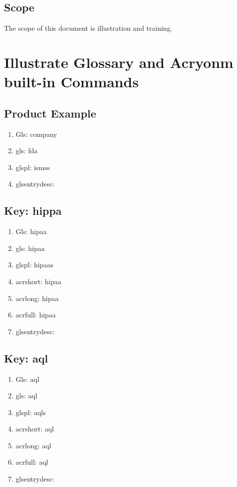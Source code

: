 \subsection{Scope}
The scope of this document is illustration and training.

\section{Illustrate Glossary and Acryonm built-in Commands}

\subsection{Product Example}
\begin{enumerate}
  \item Gls:                   \Gls{company}
  \item gls:                   \gls{fda}
  \item glspl:               \glspl{isms}
  \item glsentrydesc: 
\end{enumerate}

\subsection{Key: hippa}
\begin{enumerate}
  \item Gls:                   \Gls{hipaa}
  \item gls:                   \gls{hipaa}
  \item glspl:               \glspl{hipaa}
  \item acrshort:         \acrshort{hipaa}
  \item acrlong:           \acrlong{hipaa}
  \item acrfull:           \acrfull{hipaa}
  \item glsentrydesc: 
\end{enumerate}

\subsection{Key: aql}
\begin{enumerate}
  \item Gls:                   \Gls{aql}
  \item gls:                   \gls{aql}
  \item glspl:               \glspl{aql}
  \item acrshort:         \acrshort{aql}
  \item acrlong:           \acrlong{aql}
  \item acrfull:           \acrfull{aql}
  \item glsentrydesc: 
\end{enumerate}

